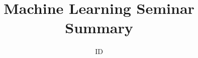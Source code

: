 \documentclass[10pt,letterpaper]{amsart}
\begin{document}
\title{\Title{} Machine Learning Seminar \\ Summary \HomeworkNumber{}}%
\author{ID \IDCode{}}%
\date{\DueBy{}}%
\maketitle


\end{document}
